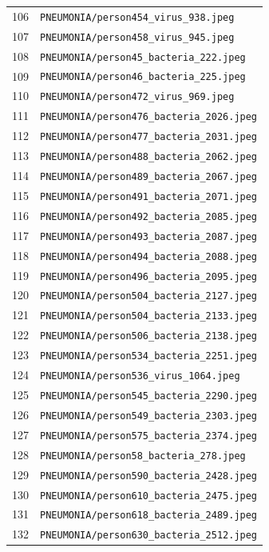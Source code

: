 \begin{longtable}{r p{12cm}}
106 & \texttt{PNEUMONIA/person454\_virus\_938.jpeg} \\
107 & \texttt{PNEUMONIA/person458\_virus\_945.jpeg} \\
108 & \texttt{PNEUMONIA/person45\_bacteria\_222.jpeg} \\
109 & \texttt{PNEUMONIA/person46\_bacteria\_225.jpeg} \\
110 & \texttt{PNEUMONIA/person472\_virus\_969.jpeg} \\
111 & \texttt{PNEUMONIA/person476\_bacteria\_2026.jpeg} \\
112 & \texttt{PNEUMONIA/person477\_bacteria\_2031.jpeg} \\
113 & \texttt{PNEUMONIA/person488\_bacteria\_2062.jpeg} \\
114 & \texttt{PNEUMONIA/person489\_bacteria\_2067.jpeg} \\
115 & \texttt{PNEUMONIA/person491\_bacteria\_2071.jpeg} \\
116 & \texttt{PNEUMONIA/person492\_bacteria\_2085.jpeg} \\
117 & \texttt{PNEUMONIA/person493\_bacteria\_2087.jpeg} \\
118 & \texttt{PNEUMONIA/person494\_bacteria\_2088.jpeg} \\
119 & \texttt{PNEUMONIA/person496\_bacteria\_2095.jpeg} \\
120 & \texttt{PNEUMONIA/person504\_bacteria\_2127.jpeg} \\
121 & \texttt{PNEUMONIA/person504\_bacteria\_2133.jpeg} \\
122 & \texttt{PNEUMONIA/person506\_bacteria\_2138.jpeg} \\
123 & \texttt{PNEUMONIA/person534\_bacteria\_2251.jpeg} \\
124 & \texttt{PNEUMONIA/person536\_virus\_1064.jpeg} \\
125 & \texttt{PNEUMONIA/person545\_bacteria\_2290.jpeg} \\
126 & \texttt{PNEUMONIA/person549\_bacteria\_2303.jpeg} \\
127 & \texttt{PNEUMONIA/person575\_bacteria\_2374.jpeg} \\
128 & \texttt{PNEUMONIA/person58\_bacteria\_278.jpeg} \\
129 & \texttt{PNEUMONIA/person590\_bacteria\_2428.jpeg} \\
130 & \texttt{PNEUMONIA/person610\_bacteria\_2475.jpeg} \\
131 & \texttt{PNEUMONIA/person618\_bacteria\_2489.jpeg} \\
132 & \texttt{PNEUMONIA/person630\_bacteria\_2512.jpeg} \\

\end{longtable}
